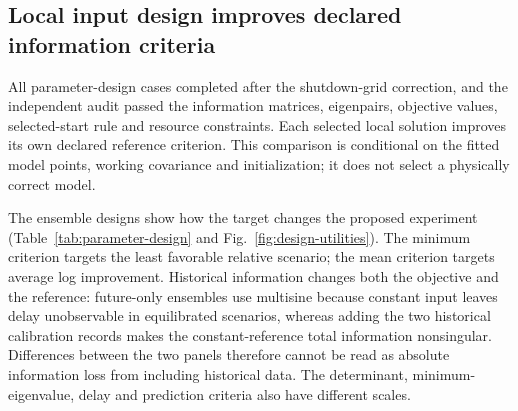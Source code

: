 \documentclass[11pt]{article}
\begin{document}



\subsection{Local input design improves declared information criteria}
All parameter-design cases completed after the shutdown-grid correction, and
the independent audit passed the information matrices, eigenpairs, objective
values, selected-start rule and resource constraints. Each selected local
solution improves its own declared reference criterion. This comparison is
conditional on the fitted model points, working covariance and initialization;
it does not select a physically correct model.

The ensemble designs show how the target changes the proposed experiment
(Table~\ref{tab:parameter-design} and Fig.~\ref{fig:design-utilities}). The
minimum criterion targets the least favorable relative scenario; the mean
criterion targets average log improvement. Historical information changes both the objective
and the reference: future-only ensembles use multisine because constant input
leaves delay unobservable in equilibrated scenarios, whereas adding the two
historical calibration records makes the constant-reference total information
nonsingular. Differences between the two panels therefore cannot be read as
absolute information loss from including historical data. The determinant,
minimum-eigenvalue, delay and prediction criteria also have different scales.
\end{document}
